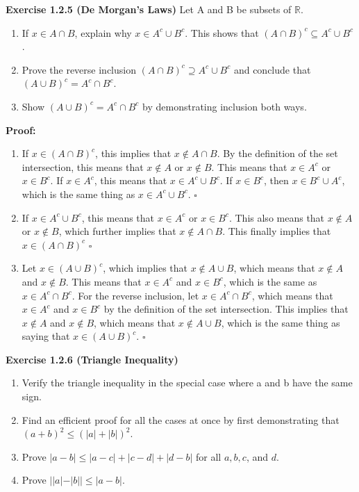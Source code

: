 \documentclass[12 pt]{article}
\newcommand{\qed}[0]{$\square$}
\begin{document}
 
\textbf{Exercise 1.2.5 (De Morgan's Laws)} Let A and B be subsets of \(\mathbb{R}\).

\begin{enumerate}
\item If \(x \in A \cap B\), explain why \(x \in A^c \cup B^c\). This shows that \((A \cap B)^c \subseteq A^c \cup B^c\).
\item Prove the reverse inclusion \((A \cap B)^c \supseteq A^c \cup B^c\) and conclude that \((A \cup B)^c = A^c \cap B^c\).
\item Show \((A \cup B)^c = A^c \cap B^c\) by demonstrating inclusion both ways.
\end{enumerate}

\vspace{5mm}
\textbf{Proof:}
\begin{enumerate}
\item If \(x \in (A \cap B)^c\), this implies that \(x \not \in A \cap B\). By the definition of the set intersection, this means that \(x \not \in A\) or \(x \not \in B\). This means that \(x \in A^c\) or \(x \in B^c\). If \(x \in A^c\), this means that \(x \in A^c \cup B^c\). If \(x \in B^c\), then \(x \in B^c \cup A^c\), which is the same thing as \(x \in  A^c \cup B^c\). \qed

\item If $x \in A^c \cup B^c$, this means that $x \in A^c$ or $x \in B^c$. This also means that $x \not \in  A$ or $x \not \in B$, which further implies that $x \not \in A \cap B$. This finally implies that $x \in (A \cap B)^c$ \qed

\item Let \(x \in (A \cup B)^c\), which implies that \(x \not \in A \cup B\), which means that \(x \not \in A\) and \(x \not \in B\). This means that \(x \in A^c\) and \(x \in B^c\), which is the same as \(x \in A^c \cap B^c\). For the reverse inclusion, let \(x \in A^c \cap B^c\), which means that \(x \in A^c\) and \(x \in B^c\) by the definition of the set intersection. This implies that \(x \not \in A\) and \(x \not \in B\), which means that \(x \not \in A \cup B\), which is the same thing as saying that \(x \in (A \cup B)^c\). \qed
\end{enumerate}

\newpage

\textbf{Exercise 1.2.6 (Triangle Inequality)}
\begin{enumerate}
\item Verify the triangle inequality in the special case where a and b have the same sign.
\item Find an efficient proof for all the cases at once by first demonstrating that $(a+b)^2 \leq (|a|+|b|)^2$.
\item Prove $|a-b| \leq |a-c| + |c-d| + |d-b|$ for all $a, b,c$, and $d$.
\item Prove $||a|-|b|| \leq |a-b|$.
\end{enumerate}
\end{document}
